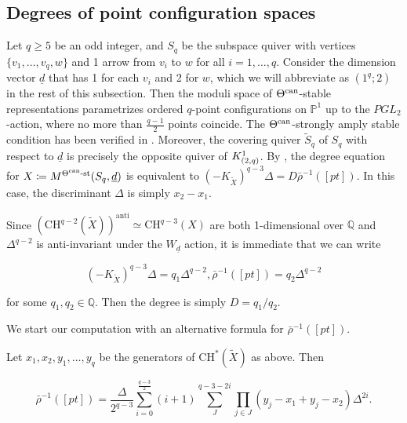 \documentclass[11pt]{article}
\begin{document}
\subsection{Degrees of point configuration spaces}\label{Subsection:4-3}

Let \(q\geq 5\) be an odd integer, and \(S_q\) be the subspace quiver with vertices \(\{v_1, \dots, v_q, w\}\) and 1 arrow from \(v_i\) to \(w\) for all \(i = 1, \dots, q\). Consider the dimension vector \(\underline{d}\) that has 1 for each \(v_i\) and 2 for \(w\), which we will abbreviate as \((1^q;2)\) in the rest of this subsection. Then the moduli space of \(\Theta^{\text{can}}\)-stable representations parametrizes ordered \(q\)-point configurations on \(\mathbb{P}^1\) up to the \(PGL_2\)-action, where no more than \(\frac{q-1}{2}\) points coincide. The \(\Theta^{\text{can}}\)-strongly amply stable condition has been verified in \cite[Section 5.1]{frRe2021fano}. Moreover, the covering quiver \(\tilde{S}_q\) of \(S_q\) with respect to \(\underline{d}\) is precisely the opposite quiver of \(K_{(2,q)}^1\). By , the degree equation for \(X\coloneqq M^{\Theta^{\text{can}}\text{-st}}(S_q, \underline{d})\) is equivalent to \((-K_{\tilde{X}})^{q-3}\Delta = D\bar{\rho}^{-1}([pt])\). In this case, the discriminant \(\Delta\) is simply \(x_2 - x_1\). 

Since \((\mathrm{CH}^{q-2}(\tilde{X}))^{\text{anti}}\simeq \mathrm{CH}^{q-3}(X)\) are both 1-dimensional over \(\mathbb{Q}\) and \(\Delta^{q-2}\) is anti-invariant under the \(W_{\underline{d}}\) action, it is immediate that we can write 

\begin{equation}
    (-K_{\tilde{X}})^{q-3}\Delta = q_1\Delta^{q-2}, \bar{\rho}^{-1}([pt]) = q_2\Delta^{q-2}
    \label{Equation:pt-config-deg-def}
\end{equation}

for some \(q_1, q_2\in \mathbb{Q}\). Then the degree is simply \(D = q_1 / q_2\). 

We start our computation with an alternative formula for \(\bar{\rho}^{-1}([pt])\). 

\begin{proposition}\label{Proposition:point-config-pt-toric}
    Let \(x_1, x_2, y_1, \dots, y_q\) be the generators of \(\mathrm{CH}^*(\tilde{X})\) as above. Then 

    \[
    \bar{\rho}^{-1}([pt]) = \frac{\Delta}{2^{q-3}}\sum_{i = 0}^{\frac{q-3}{2}}(i+1)\sum_J^{q-3-2i}\prod_{j\in J}(y_j - x_1 + y_j - x_2)\Delta^{2i}.
    \]
\end{proposition}
\end{document}
